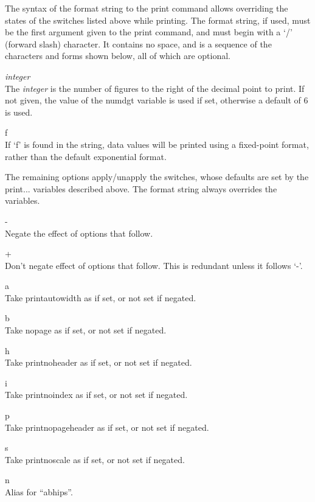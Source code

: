 The syntax of the format string to the {\cb print} command allows
overriding the states of the switches listed above while printing. 
The format string, if used, must be the first argument given to the
{\cb print} command, and must begin with a `{\vt /}' (forward slash)
character.  It contains no space, and is a sequence of the characters
and forms shown below, all of which are optional.

\begin{description}
\item{\it integer}\\
The {\it integer} is the number of figures to the right of the decimal
point to print.  If not given, the value of the {\et numdgt} variable
is used if set, otherwise a default of 6 is used.

\item{\vt f}\\
If `{\vt f}' is found in the string, data values will be printed using
a fixed-point format, rather than the default exponential format.
\end{description}

The remaining options apply/unapply the switches, whose defaults are
set by the {\et print...} variables described above.  The format
string always overrides the variables.

\begin{description}
\item{\vt -}\\
Negate the effect of options that follow.
\item{\vt +}\\
Don't negate effect of options that follow.  This is redundant
unless it follows `{\vt -}'.
\item{\vt a}\\
Take {\et printautowidth} as if set, or not set if negated.
\item{\vt b}\\
Take {\et nopage} as if set, or not set if negated.
\item{\vt h}\\
Take {\et printnoheader} as if set, or not set if negated.
\item{\vt i}\\
Take {\et printnoindex} as if set, or not set if negated.
\item{\vt p}\\
Take {\et printnopageheader} as if set, or not set if negated.
\item{\vt s}\\
Take {\et printnoscale} as if set, or not set if negated.
\item{\vt n}\\
Alias for ``{\vt abhips}''.
\end{description}

